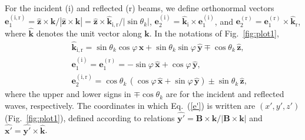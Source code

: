 \documentclass{aa}
\newcommand{\bea}{\begin{eqnarray}}
\newcommand{\eea}{\end{eqnarray}}
\newcommand{\req}[1]{Eq.~(\ref{#1})}
\begin{document}
For the incident (i) and reflected (r) beams, we define orthonormal
vectors
$\bm{e}_1^\mathrm{(i,r)}=\hat{\mathbf{z}}\times\bm{k}/|\hat{\mathbf{z}}\times\bm{k}|
=\hat{\mathbf{z}}\times\hat{\mathbf{k}}_\mathrm{i,r}/|\sin\theta_k|$,
$\bm{e}_2^\mathrm{(i)}=\hat{\mathbf{k}}_\mathrm{i}
  \times\bm{e}_1^\mathrm{(i)}$, and
$\bm{e}_2^\mathrm{(r)}=\bm{e}_1^\mathrm{(r)}
  \times\hat{\mathbf{k}}_\mathrm{r}$, where 
$\hat{\mathbf{k}}$
denotes the unit vector along $\bm{k}$.
In the notations of Fig.~\ref{fig:plot1},
\bea&&\!\!
   \hat{\mathbf{k}}_\mathrm{i,r} =
       \sin\theta_k\cos\varphi \,\hat{\mathbf{x}}
       + \sin\theta_k\sin\varphi \, \hat{\mathbf{y}}
       \mp\cos\theta_k \, \hat{\mathbf{z}},
\\&&\!\!
   \bm{e}_1^\mathrm{(i)} = \bm{e}_1^\mathrm{(r)}
    =  -\sin\varphi \,\hat{\mathbf{x}}
    + \cos\varphi  \,\hat{\mathbf{y}},
\\&&\!\! 
   \bm{e}_2^\mathrm{(i,r)} = 
       \cos\theta_k \,
       (\cos\varphi \,\hat{\mathbf{x}}
       + \sin\varphi  \,\hat{\mathbf{y}} )
       \pm \sin\theta_k\, \hat{\mathbf{z}},
\eea
where the upper and lower signs in $\mp\cos\theta_k$ are for the
incident and reflected waves, respectively.
The coordinates in which
\req{e'} is written are $(x',y',z')$ (Fig.~\ref{fig:plot1}),
defined according to relations
$\hat{\mathbf{y'}}=\bm{B}\times\bm{k}/|\bm{B}\times\bm{k}|$
and 
$\hat{\mathbf{x'}}=\hat{\mathbf{y'}}\times\hat{\mathbf{k}}$. 
\end{document}
